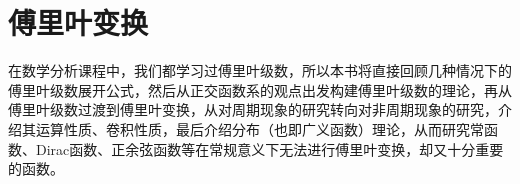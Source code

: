 \chapter{傅里叶变换}%
在数学分析课程中，我们都学习过傅里叶级数，所以本书将直接回顾几种情况下的傅里叶级数展开公式，然后从正交函数系的观点出发构建傅里叶级数的理论，再从傅里叶级数过渡到傅里叶变换，从对周期现象的研究转向对非周期现象的研究，介绍其运算性质、卷积性质，最后介绍分布（也即广义函数）理论，从而研究常函数、Dirac函数、正余弦函数等在常规意义下无法进行傅里叶变换，却又十分重要的函数。





